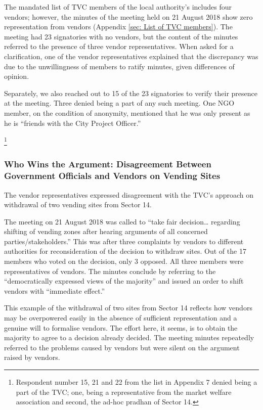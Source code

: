 \documentclass[a4paper, 12pt, twoside]{article}
\begin{document}
{The mandated list of TVC members of the local authority’s includes four vendors; however, the minutes of the meeting held on 21 August 2018 show zero representation from vendors (Appendix \ref{sec: List of TVC members}). The meeting had 23 signatories with no vendors, but the content of the minutes referred to the presence of three vendor representatives. When asked for a clarification, one of the vendor representatives explained that the discrepancy was due to the unwillingness of members to ratify minutes, given differences of opinion.

Separately, we also reached out to 15 of the 23 signatories to verify their presence at the meeting. Three denied being a part of any such meeting. One NGO member, on the condition of anonymity, mentioned that he was only present as he is “friends with the City Project Officer.”{\footnote{Respondent number 15, 21 and 22 from the list in Appendix 7 denied being a part of the TVC; one, being a representative from the market welfare association and second, the ad-hoc pradhan of Sector 14.}

\subsubsection*{Who Wins the Argument: Disagreement Between Government Officials and Vendors on Vending Sites}

The vendor representatives expressed disagreement with the TVC’s approach on withdrawal of two vending sites from Sector 14.

The meeting on 21 August 2018 was called to “take fair decision… regarding shifting of vending zones after hearing arguments of all concerned parties/stakeholders.” This was after three complaints by vendors to different authorities for reconsideration of the decision to withdraw sites. Out of the 17 members who voted on the decision, only 3 opposed. All three members were representatives of vendors. The minutes conclude by referring to the “democratically expressed views of the majority” and issued an order to shift vendors with “immediate effect.”

This example of the withdrawal of two sites from Sector 14 reflects how vendors may be overpowered easily in the absence of sufficient representation and a genuine will to formalise vendors. The effort here, it seems, is to obtain the majority to agree to a decision already decided. The meeting minutes repeatedly referred to the problems caused by vendors but were silent on the argument raised by vendors.

}}
\end{document}
